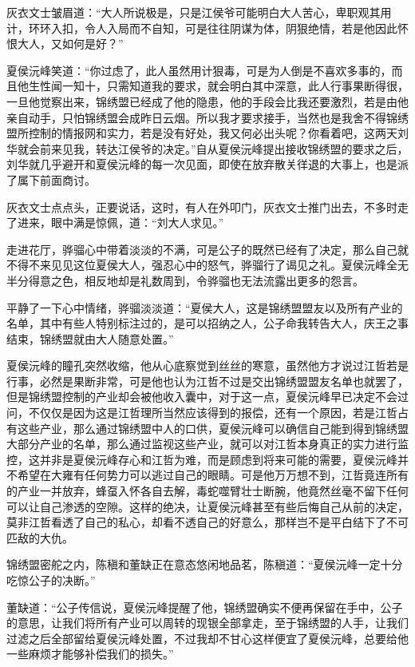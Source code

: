灰衣文士皱眉道：“大人所说极是，只是江侯爷可能明白大人苦心，卑职观其用计，环环入扣，令人入局而不自知，可是往往阴谋为体，阴狠绝情，若是他因此怀恨大人，又如何是好？”

夏侯沅峰笑道：“你过虑了，此人虽然用计狠毒，可是为人倒是不喜欢多事的，而且他生性闻一知十，只需知道我的要求，就会明白其中深意，此人行事果断得很，一旦他觉察出来，锦绣盟已经成了他的隐患，他的手段会比我还要激烈，若是由他亲自动手，只怕锦绣盟会成昨日云烟。所以我才要求接手，当然也是我舍不得锦绣盟所控制的情报网和实力，若是没有好处，我又何必出头呢？你看着吧，这两天刘华就会前来见我，转达江侯爷的决定。”自从夏侯沅峰提出接收锦绣盟的要求之后，刘华就几乎避开和夏侯沅峰的每一次见面，即使在放弃散关徉退的大事上，也是派了属下前面商讨。

灰衣文士点点头，正要说话，这时，有人在外叩门，灰衣文士推门出去，不多时走了进来，眼中满是惊佩，道：“刘大人求见。”

走进花厅，骅骝心中带着淡淡的不满，可是公子的既然已经有了决定，那么自己就不得不来见见这位夏侯大人，强忍心中的怒气，骅骝行了谒见之礼。夏侯沅峰全无半分得意之色，相反地却是礼数周到，令骅骝也无法流露出更多的怨言。

平静了一下心中情绪，骅骝淡淡道：“夏侯大人，这是锦绣盟盟友以及所有产业的名单，其中有些人特别标注过的，是可以招纳之人，公子命我转告大人，庆王之事结束，锦绣盟就由大人随意处置。”

夏侯沅峰的瞳孔突然收缩，他从心底察觉到丝丝的寒意，虽然他方才说过江哲若是行事，必然是果断非常，可是他也认为江哲不过是交出锦绣盟盟友名单也就罢了，但是锦绣盟控制的产业却会被他收入囊中，对于这一点，夏侯沅峰早已决定不会过问，不仅仅是因为这是江哲理所当然应该得到的报偿，还有一个原因，若是江哲占有这些产业，那么通过锦绣盟中人的口供，夏侯沅峰可以确信自己能到得到锦绣盟大部分产业的名单，那么通过监视这些产业，就可以对江哲本身真正的实力进行监控，这并非是夏侯沅峰存心和江哲为难，而是顾虑到将来可能的需要，夏侯沅峰并不希望在大雍有任何势力可以逃过自己的眼睛。可是他万万想不到，江哲竟连所有的产业一并放弃，蜂虿入怀各自去解，毒蛇噬臂壮士断腕，他竟然丝毫不留下任何可以让自己渗透的空隙。这样的绝决，让夏侯沅峰甚至有些后悔自己从前的决定，莫非江哲看透了自己的私心，却看不透自己的好意么，那样岂不是平白结下了不可匹敌的大仇。

锦绣盟密舵之内，陈稹和董缺正在意态悠闲地品茗，陈稹道：“夏侯沅峰一定十分吃惊公子的决断。”

董缺道：“公子传信说，夏侯沅峰提醒了他，锦绣盟确实不便再保留在手中，公子的意思，让我们将所有产业可以周转的现银全部拿走，至于锦绣盟的人手，让我们过滤之后全部留给夏侯沅峰处置，不过我却不甘心这样便宜了夏侯沅峰，总要给他一些麻烦才能够补偿我们的损失。”

